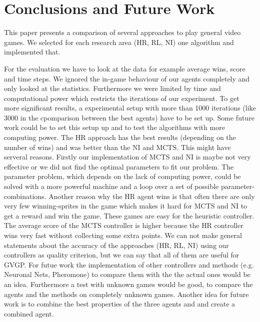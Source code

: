 \section{Conclusions and Future Work} 
\label{sec:conc}

This paper presents a comparison of several approaches to play general video games. We selected for each research area (\ac{HR}, \ac{RL}, \ac{NI})
one algorithm and implemented that. 


For the evaluation we have to look at the data for example average wins, score and time steps.
We ignored the in-game behaviour of our agents completely and only looked at the statistics. 
Furthermore we were limited by time and computational power which restricts the iterations of our experiment. 
To get more significant results, a experimental setup with more than 1000 iterations (like 3000 in the cpomparison between the best agents) have to be set up.
Some future work could be to set this setup up and to test the algorithms with more computing power.  
The \ac{HR} approach has the best results (depending on the number of wins) and was better than the \ac{NI} and \ac{MCTS}. This might have serveral reasons. Firstly our implementation of \ac{MCTS} and \ac{NI} is maybe not very effective or we did not find the optimal parameters to fit our problem. The parameter problem, which depends on the lack of computing power, could be solved with a more powerful machine and a loop over a set of possible parameter-combinations.
Another reason why the \ac{HR} agent wins is that often there are only very few winning-sprites in the game which makes it hard for \ac{MCTS} and \ac{NI} to get a reward and win the game. These games are easy for the heuristic controller. The average score of the \ac{MCTS} controller is higher because the \ac{HR} controller wins very fast without collecting some extra points. 
We can not make general statements about the accuracy of the approaches (\acs{HR}, \acs{RL}, \acs{NI}) using our controllers as quality criterion, but we can say that all of them are useful for \ac{GVGP}.
For futue work the implementation of other controllers and methods (e.g. Neuronal Nets, Pheromone) to compare them with the the actual ones would be an idea. Furthermore a test with unknown games would be good, to compare the agents and the methods on completely unknown games.
Another idea for future work is to combine the best properties of the three agents and and create a combined agent.


